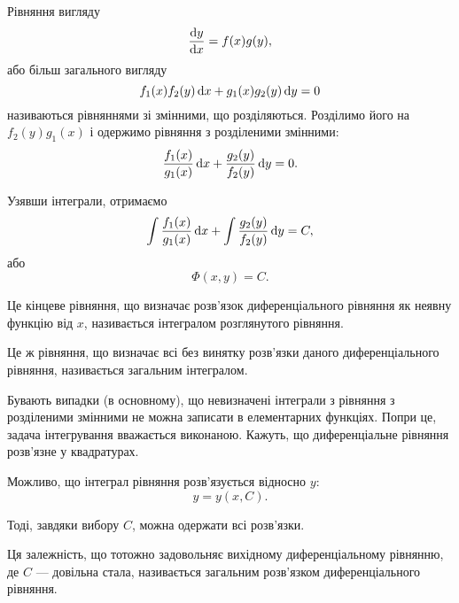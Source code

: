 Рівняння вигляду
\begin{equation*}
    \frac{\mathop{}\!\mathrm{d} y}{\mathop{}\!\mathrm{d} x} = f(x) g(y),
\end{equation*}
або більш загального вигляду
\begin{equation*}
    f_1(x) f_2(y) \mathop{}\!\mathrm{d} x + g_1(x) g_2(y) \mathop{}\!\mathrm{d} y = 0
\end{equation*}
називаються рівняннями зі змінними, що розділяються. Розділимо його на $f_2(y) g_1(x)$ і одержимо рівняння з розділеними змінними:
\begin{equation*}
    \frac{f_1(x)}{g_1(x)} \mathop{}\!\mathrm{d} x + \frac{g_2(y)}{f_2(y)} \mathop{}\!\mathrm{d} y = 0.
\end{equation*}

Узявши інтеграли, отримаємо
\begin{equation*}
    \int \frac{f_1(x)}{g_1(x)} \mathop{}\!\mathrm{d} x + \int \frac{g_2(y)}{f_2(y)} \mathop{}\!\mathrm{d} y = C,
\end{equation*}
або
\begin{equation*}
    \Phi(x, y) = C.
\end{equation*}

\begin{definition}
    Це кінцеве рівняння, що визначає розв'язок диференціального рівняння як неявну функцію від $x$, називається інтегралом розглянутого рівняння.
\end{definition}

\begin{definition}
    Це ж рівняння, що визначає всі без винятку розв'язки даного диференціального рівняння, називається загальним інтегралом.
\end{definition}

Бувають випадки (в основному), що невизначені інтеграли з рівняння з розділеними змінними не можна записати в елементарних функціях. Попри це, задача інтегрування вважається виконаною. Кажуть, що диференціальне рівняння розв'язне у квадратурах. \parvskip

Можливо, що інтеграл рівняння розв'язується відносно $y$:
\begin{equation*}
    y = y(x, C).
\end{equation*}

Тоді, завдяки вибору $C$, можна одержати всі розв'язки.

\begin{definition}
    Ця залежність, що тотожно задовольняє вихідному диференціальному рівнянню, де $C$ --- довільна стала, називається загальним розв'язком диференціального рівняння.
\end{definition}

